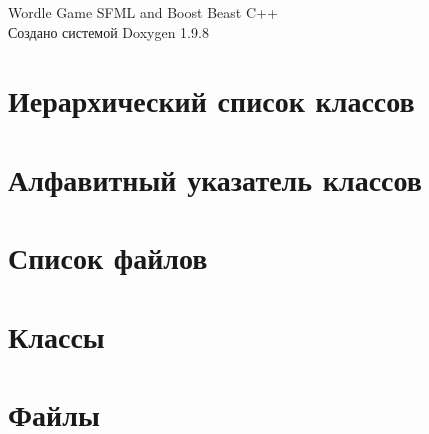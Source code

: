\documentclass[twoside]{book}
\newcommand{\+}{\discretionary{\mbox{\scriptsize$\hookleftarrow$}}{}{}}
\newcommand{\clearemptydoublepage}{%
    \newpage{\pagestyle{empty}\cleardoublepage}%
  }
\begin{document}
  \raggedbottom
    \hypersetup{pageanchor=false,
                bookmarksnumbered=true,
                pdfencoding=unicode
               }
  \begin{titlepage}
  \vspace*{7cm}
  \begin{center}%
  {\Large Wordle Game SFML and Boost Beast C++}\\
  \vspace*{1cm}
  {\large Создано системой Doxygen 1.9.8}\\
  \end{center}
  \end{titlepage}
  \clearemptydoublepage
  \tableofcontents
  \clearemptydoublepage
  \hypersetup{pageanchor=true}
\chapter{Иерархический список классов}

\chapter{Алфавитный указатель классов}

\chapter{Список файлов}

\chapter{Классы}










\chapter{Файлы}
























  \backmatter
  \newpage
  \clearemptydoublepage
  \printindex
\end{document}
